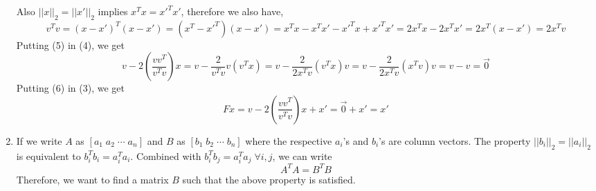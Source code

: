 \documentclass{article}
\begin{document}
\begin{enumerate}
\begin{equation}
    \end{equation}
    Also $||x||_2 = ||x'||_2$ implies $x^Tx = x'^Tx'$, therefore we also have,
    \begin{equation}
    v^Tv = (x - x')^T(x - x') = (x^T - x'^T)(x - x') = x^Tx - x^Tx' - x'^Tx + x'^Tx' = 2x^Tx - 2x^Tx' = 2x^T(x - x') = 2x^Tv
    \end{equation}
    Putting (5) in (4), we get
    \begin{equation}
    v - 2(\frac{vv^T}{v^Tv})x = v - \frac{2}{v^Tv}v(v^Tx) = v - \frac{2}{2x^Tv}(v^Tx)v = v - \frac{2}{2x^Tv}(x^Tv)v = v - v = \vec{0}
    \end{equation}
    Putting (6) in (3), we get
    $$Fx = v - 2(\frac{vv^T}{v^Tv})x + x' = \vec{0} + x' = x'$$
    \clearpage
    \item If we write $A$ as $[a_1 \; a_2 \; \cdots \; a_n]$ and $B$ as $[b_1 \; b_2 \; \cdots \; b_n]$ where the respective $a_i$'s and $b_i$'s are column vectors. The property $||b_i||_2 = ||a_i||_2$ is equivalent to $b_i^Tb_i = a_i^Ta_i$. Combined with $b_i^Tb_j = a_i^Ta_j \; \forall i,j$, we can write
    $$A^TA = B^TB$$
    Therefore, we want to find a matrix $B$ such that the above property is satisfied.


\end{enumerate}
\end{document}

